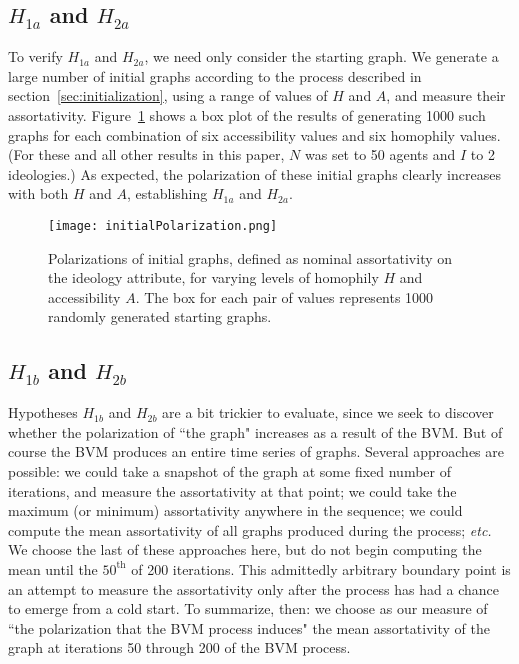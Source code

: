 
\subsection{$H_{1a}$ and $H_{2a}$}

To verify $H_{1a}$ and $H_{2a}$, we need only consider the starting graph. We
generate a large number of initial graphs according to the process described
in section~\ref{sec:initialization}, using a range of values of $H$ and $A$,
and measure their assortativity. Figure~\ref{fig:initialPolarization} shows a
box plot of the results of generating 1000 such graphs for each combination of
six accessibility values and six homophily values. (For these and all other
results in this paper, $N$ was set to 50 agents and $I$ to 2 ideologies.) As
expected, the polarization of these initial graphs clearly increases with both
$H$ and $A$, establishing $H_{1a}$ and $H_{2a}$.

\begin{figure}
\centering
\texttt{[image: initialPolarization.png]}
\caption{Polarizations of initial graphs, defined as nominal assortativity on
the ideology attribute, for varying levels of homophily $H$ and accessibility
$A$. The box for each pair of values represents 1000 randomly generated
starting graphs.}
\label{fig:initialPolarization}
\end{figure}

\subsection{$H_{1b}$ and $H_{2b}$}

Hypotheses $H_{1b}$ and $H_{2b}$ are a bit trickier to evaluate, since we seek
to discover whether the polarization of ``the graph" increases as a result
of the BVM. But of course the BVM produces an entire time series of graphs.
Several approaches are possible: we could take a snapshot of the graph at some
fixed number of iterations, and measure the assortativity at that point; we
could take the maximum (or minimum) assortativity anywhere in the sequence; we
could compute the mean assortativity of all graphs produced during the
process; \textit{etc.} We choose the last of these approaches here, but do not
begin computing the mean until the $50^{\text{th}}$ of 200 iterations. This
admittedly arbitrary boundary point is an attempt to measure the assortativity
only after the process has had a chance to emerge from a cold start. To
summarize, then: we choose as our measure of ``the polarization that the BVM
process induces" the mean assortativity of the graph at iterations 50 through
200 of the BVM process.

